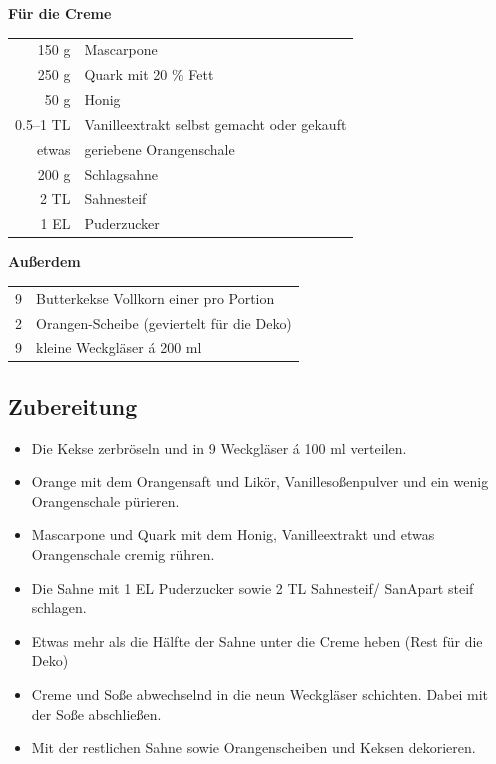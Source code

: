     \textbf{Für die Creme}\\
    \begin{tabular}{r l}
           150 g & Mascarpone                                   \\
           250 g & Quark mit 20 \% Fett                         \\
            50 g & Honig                                        \\
        0.5–1 TL & Vanilleextrakt selbst gemacht oder gekauft   \\
           etwas & geriebene Orangenschale                      \\
           200 g & Schlagsahne                                  \\
            2 TL & Sahnesteif                                   \\
            1 EL & Puderzucker                                
    \end{tabular}
    
    \textbf{Außerdem} \\
    \begin{tabular}{r l}
         9 & Butterkekse Vollkorn einer pro Portion \\
         2 & Orangen-Scheibe (geviertelt für die Deko)\\
         9 & kleine Weckgläser á 200 ml
    \end{tabular}
    
    \subsection*{Zubereitung}
    \begin{itemize}
        \item Die Kekse zerbröseln und in 9 Weckgläser á 100 ml verteilen.
        \item Orange mit dem Orangensaft und Likör, Vanillesoßenpulver und ein wenig Orangenschale pürieren.
        \item Mascarpone und Quark mit dem Honig, Vanilleextrakt und etwas Orangenschale cremig rühren.
        \item Die Sahne mit 1 EL Puderzucker sowie 2 TL Sahnesteif/ SanApart steif schlagen.
        \item Etwas mehr als die Hälfte der Sahne unter die Creme heben (Rest für die Deko)
        \item Creme und Soße abwechselnd in die neun Weckgläser schichten. Dabei mit der Soße abschließen.
        \item  Mit der restlichen Sahne sowie Orangenscheiben und Keksen dekorieren.
    \end{itemize}

